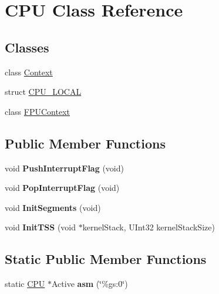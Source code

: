 \hypertarget{class_c_p_u}{}\section{C\+PU Class Reference}
\label{class_c_p_u}
\subsection*{Classes}
\begin{DoxyCompactItemize}
\item 
class \hyperlink{class_c_p_u_1_1_context}{Context}
\item 
struct \hyperlink{struct_c_p_u_1_1_c_p_u___l_o_c_a_l}{C\+P\+U\+\_\+\+L\+O\+C\+AL}
\item 
class \hyperlink{class_c_p_u_1_1_f_p_u_context}{F\+P\+U\+Context}
\end{DoxyCompactItemize}
\subsection*{Public Member Functions}
\begin{DoxyCompactItemize}
\item 
\mbox{\label{class_c_p_u_a20206a3df3ca597e99bdf966df89af57}} 
void {\bfseries Push\+Interrupt\+Flag} (void)
\item 
\mbox{\label{class_c_p_u_a7d27d44a71bdd1aa1afa493232b6b44e}} 
void {\bfseries Pop\+Interrupt\+Flag} (void)
\item 
\mbox{\label{class_c_p_u_aab8ed436360feede06ddab846a391111}} 
void {\bfseries Init\+Segments} (void)
\item 
\mbox{\label{class_c_p_u_a5f0a7b53661c9e17a826a653d81b0668}} 
void {\bfseries Init\+T\+SS} (void $\ast$kernel\+Stack, U\+Int32 kernel\+Stack\+Size)
\end{DoxyCompactItemize}
\subsection*{Static Public Member Functions}
\begin{DoxyCompactItemize}
\item 
\mbox{\label{class_c_p_u_a0067ab50ec54c16b162becc95fc55c9f}} 
static \hyperlink{class_c_p_u}{C\+PU} $\ast$Active {\bfseries asm} (\char`\"{}\%gs\+:0\char`\"{})
\end{DoxyCompactItemize}

